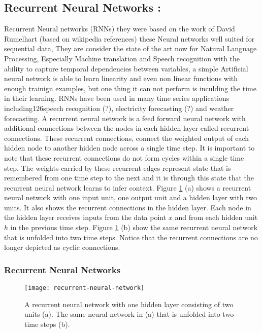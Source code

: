 \subsection{Recurrent Neural Networks :}
Recurrent Neural networks (RNNs) they were based on the work of  David Rumelhart \cite{} (based on wikipedia references) these Neural networks  well suited for sequential  data, They are consider the state of the art now for Natural Language Processing, Especially Machine translation \citet{} and Speech recognition \citet{} with the ability to capture temporal dependencies between variables, a simple Artificial neural network is able to learn linearity and even non linear functions with enough trainign examples, but one thing it can not perform is inculding the time in their learning.  RNNs have been used in many time series applications including126speech recognition (?), electricity forecasting (?)  and weather forecasting.
A recurrent neural network is a feed forward neural network with additional connections between the nodes in each hidden layer called recurrent connections. These recurrent connections, connect the weighted output of each hidden node to another hidden node across a single time step. It is important to note that these recurrent connections do not form cycles within a single time step. The weights carried by these recurrent edges represent state that is remembered from one time step to the next and it is through this state that the recurrent neural network learns to infer context\cite{DBLP:journals/corr/Lipton15}.
Figure \ref{fig:recurrent-neural-network} (a) shows a recurrent neural network with one input unit, one output unit and a hidden layer with two units. It also shows the recurrent connections in the hidden layer. Each node in the hidden layer receives inputs from the data point $x$ and from each hidden unit $h$ in the previous time step. Figure \ref{fig:recurrent-neural-network} (b) show the same recurrent neural network that is unfolded into two time steps. Notice that the recurrent connections are no longer depicted as cyclic connections.

\subsubsection{Recurrent Neural Networks}
\begin{figure}
\centering	
\texttt{[image: recurrent-neural-network]}
\caption{A recurrent neural network with one hidden layer consisting of two units (a). The same neural network in (a) that is unfolded into two time steps (b).}
\label{fig:recurrent-neural-network}
\end{figure}


